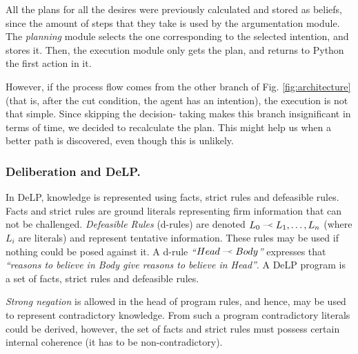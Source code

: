     All the plans for all the desires were previously calculated and stored as 
    beliefs, since the amount of steps that they take is used by the 
    argumentation module. The \textit{planning} module selects the one 
    corresponding to the selected intention, and stores it. Then, the 
    execution module only gets the plan, and returns to Python the first 
    action in it.

    However, if the process flow comes from the other branch of Fig. 
    \ref{fig:architecture} (that is, after the cut condition, the agent has an 
    intention), the execution is not that simple. Since skipping the decision-
    taking makes this branch insignificant in terms of time, we decided to 
    recalculate the plan. This might help us when a better path is discovered, 
    even though this is unlikely.




    

\subsubsection{Deliberation and DeLP.}
    \newcommand{\drule}[2]{\mbox{$ #1\; \defleftarrow \; #2$}}
    \newcommand{\defleftarrow}{{\raise1.5pt\hbox{\tiny\defleft}}}
    \newcommand{\defleft}{\mbox{---\hspace{-1.5pt}\raise.05pt\hbox{$<$}}}
    In DeLP\cite{Garcia:2004a}, knowledge is represented using facts, strict rules
    and defeasible rules. Facts and strict rules are ground literals representing
    firm information that can not be challenged. \textit{Defeasible Rules}
    (d-rules) are denoted $\drule{L_0}{L_1, \ldots, L_n}$ (where $L_i$ are literals)
    and represent tentative information. These rules may be used if nothing could
    be posed against it. A d-rule \textit{``\drule{Head}{Body}''} expresses that
    \textit{``reasons to believe in Body give reasons to believe in Head''}. A DeLP
    program is a set of facts, strict rules and defeasible rules. 

    {\it Strong negation} is allowed in the head of program rules, and hence, may
    be used to represent contradictory knowledge. From such a program contradictory
    literals could be derived, however,  the set of facts and strict rules must
    possess certain internal coherence (it has to be non-contradictory). 

